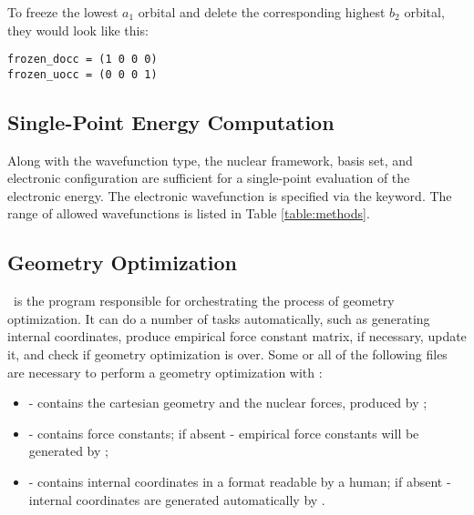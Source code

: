To freeze the lowest $a_1$ orbital and delete the corresponding
highest $b_2$ orbital, they would look like this: 
\begin{verbatim}
frozen_docc = (1 0 0 0)
frozen_uocc = (0 0 0 1)
\end{verbatim}

\subsection{Single-Point Energy Computation}
Along with the wavefunction type, the nuclear framework, basis set,
and electronic configuration are sufficient
for a single-point evaluation of the electronic energy.
The electronic wavefunction is specified via the  keyword.
The range of allowed wavefunctions is listed in Table \ref{table:methods}.

\subsection{Geometry Optimization}

\PSIoptking\ is the program responsible for orchestrating the process
of geometry optimization. It can do a number of tasks automatically,
such as generating internal coordinates, produce empirical force
constant matrix, if necessary, update it, and check if geometry
optimization is over. Some or all of the following files are necessary
to perform a geometry optimization with \PSIoptking: 
\begin{itemize}
\item {} - contains the cartesian geometry and the nuclear
      forces, produced by \PSIcderiv ; 
\item \fconstdat - contains force
      constants; if absent - empirical force constants will be generated by
      \PSIoptking ; 
\item \intcodat - contains internal coordinates in a
      format readable by a human; if absent - internal coordinates are
      generated automatically by \PSIoptking .  
\end{itemize}

